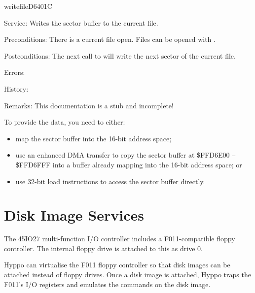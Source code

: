 \newpage
\begin{hyppotrap}{writefile}{D640}{1C}
\item [Service:]
  Writes the sector buffer to the current file.
\item [Preconditions:]
  There is a current file open. Files can be opened with .
\item [Postconditions:]
  The next call to  will write the next sector of the current
  file.
\item [Errors:]
\item [History:]
\item [Remarks:]
  This documentation is a stub and incomplete!

  To provide the data, you need to either:
  \begin{itemize}
    \item map the sector buffer into the 16-bit address space;
    \item use an enhanced DMA transfer to copy the sector buffer at
          \$FFD6E00 -- \$FFD6FFF into a buffer already mapping into the 16-bit
          address space; or
    \item use 32-bit load instructions to access the sector buffer directly.
  \end{itemize}
\end{hyppotrap}



\newpage
\section{Disk Image Services}

The 45IO27 multi-function I/O controller includes a F011-compatible floppy
controller. The internal floppy drive is attached to this as drive 0.

Hyppo can virtualise the F011 floppy controller so that disk images
can be attached instead of floppy drives. Once a disk image is attached,
Hyppo traps the F011's I/O registers and emulates the commands on the disk
image.

